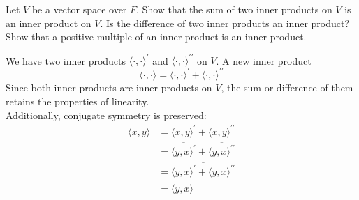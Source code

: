 \documentclass[11pt]{article}
\begin{document}
\makeAssignmentTitle

\begin{homeworkProblem}

    Let $V$ be a vector space over $F$. Show that the sum of two inner products on $V$ is an inner
    product on $V$. Is the difference of two inner products an inner product? Show that a positive
    multiple of an inner product is an inner product. \\

    \solution

    We have two inner products \(\langle \cdot , \cdot \rangle^{\prime} \) and \(\langle \cdot , \cdot \rangle^{\prime\prime}\) on \(V\). A new inner product
    \[
        \langle \cdot, \cdot \rangle = \langle \cdot , \cdot \rangle^{\prime} + \langle \cdot , \cdot \rangle^{\prime\prime}
    \]
    Since both inner products are inner products on $V$, the sum or difference of them retains the properties of linearity. \\

    Additionally, conjugate symmetry is preserved:
    \begin{align*}
        \langle x, y \rangle & = \langle x , y \rangle^{\prime} + \langle x , y \rangle^{\prime\prime}                       \\
                             & = \overline{\langle y , x \rangle^{\prime}} + \overline{\langle y , x \rangle^{\prime\prime}} \\
                             & = \overline{\langle y , x \rangle^{\prime} + \langle y , x \rangle^{\prime\prime}}            \\
                             & = \overline{\langle y , x \rangle}
    \end{align*}

\end{homeworkProblem}

\pagebreak
\end{document}
